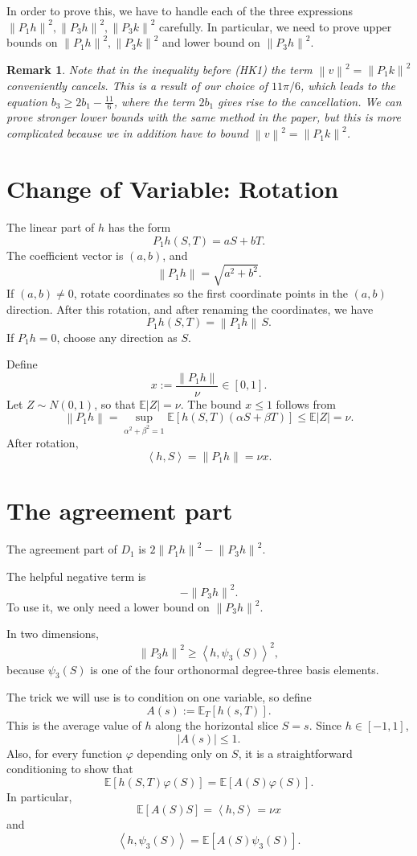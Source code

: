 \documentclass[11pt]{article}
\newtheorem{remark}[theorem]{Remark}
\newcommand{\E}{\mathbb E}
\newcommand{\ip}[2]{\left\langle #1,#2\right\rangle}
\newcommand{\norm}[1]{\left\|#1\right\|}
\begin{document}
In order to prove this, we have to handle each of the three expressions $\norm{P_1h}^2, \norm{P_3h}^2, \norm{P_3k}^2$ carefully. In particular, we need to prove upper bounds on  $\norm{P_1h}^2, \norm{P_3k}^2$ and lower bound on $\norm{P_3h}^2$. 

\begin{remark}
    Note that in the inequality before (HK1) the term $\norm{v}^2 = \norm{P_1k}^2$ conveniently cancels. This is a result of our choice of $11\pi/6$, which leads to the equation $b_3 \geq 2b_1 - \frac{11}{6}$, where the term $2b_1$ gives rise to the cancellation. We can prove stronger lower bounds with the same method in the paper, but this is more complicated because we in addition have to bound $\norm{v}^2 = \norm{P_1k}^2$.
\end{remark}

\section{Change of Variable: Rotation}

The linear part of $h$ has the form
\[
        P_1h(S,T)=aS+bT.
\]
The coefficient vector is $(a,b)$, and
\[
        \norm{P_1h}=\sqrt{a^2+b^2}.
\]
If $(a,b)\neq0$, rotate coordinates so the first coordinate points in the $(a,b)$ direction. After this rotation, and after renaming the coordinates, we have
\[
        P_1h(S,T)=\norm{P_1h}\,S.
\]
If $P_1h=0$, choose any direction as $S$.

Define
\[
        x:=\frac{\norm{P_1h}}{\nu}\in[0,1].
\]
Let $Z \sim N(0,1)$, so that $\mathbb{E}|Z| = \nu$. The bound $x\le1$ follows from
\[
        \norm{P_1h}=\sup_{\alpha^2+\beta^2=1}\E[h(S,T)(\alpha S+\beta T)]
        \le \E|Z|=\nu.
\]
After rotation,
\[
        \ip{h}{S}=\norm{P_1h}=\nu x.
\]

\section{The agreement part}

The agreement part of $D_1$ is $2\norm{P_1h}^2-\norm{P_3h}^2$.

The helpful negative term is
\[
        -\norm{P_3h}^2.
\]
To use it, we only need a lower bound on $\norm{P_3h}^2$.

In two dimensions,
\[
        \norm{P_3h}^2
        \ge \ip{h}{\psi_3(S)}^2,
\]
because $\psi_3(S)$ is one of the four orthonormal degree-three basis elements.

The trick we will use is to condition on one variable, so define
\[
        A(s):=\E_T[h(s,T)].
\]
This is the average value of $h$ along the horizontal slice $S=s$.  Since $h\in[-1,1]$,
\[
        |A(s)|\le1.
\]
Also, for every function $\varphi$ depending only on $S$, it is a straightforward conditioning to show that 
\[
        \E[h(S,T)\varphi(S)]=\E[A(S)\varphi(S)].
\]
In particular,
\[
        \E[A(S)S]=\ip{h}{S}=\nu x
\]
and
\[
        \ip{h}{\psi_3(S)}=\E[A(S)\psi_3(S)].
\]
\end{document}
